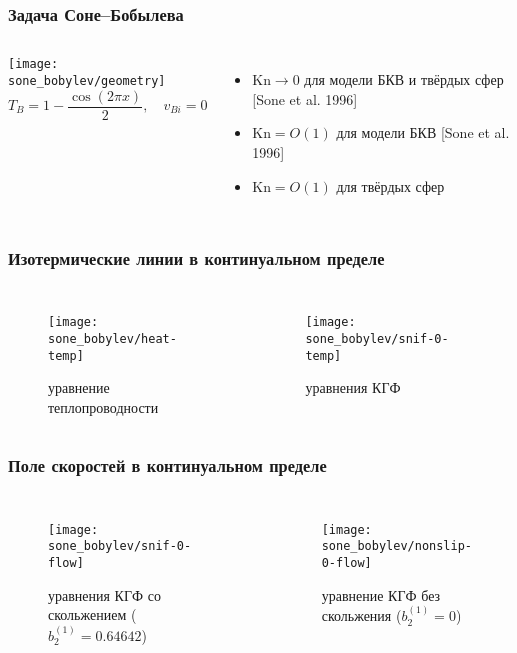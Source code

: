 \documentclass[mathserif]{beamer} %
\newcommand{\Kn}{\mathrm{Kn}}
\newcommand{\OO}[1]{O(#1)}
\begin{document}
\begin{frame}
    \frametitle{Задача Соне--Бобылева}
    \begin{columns}
        \hspace{-10pt}\texttt{[image: sone\_bobylev/geometry]}
        \[ T_B = 1 - \frac{\cos(2\pi x)}{2}, \quad v_{Bi} = 0 \]
        \begin{itemize}
            \item \(\Kn\to0\) для модели БКВ и твёрдых сфер [Sone et al. 1996]
            \smallskip
            \item \(\Kn=\OO{1}\) для модели БКВ [Sone et al. 1996]
            \smallskip
            \item \(\Kn=\OO{1}\) для твёрдых сфер
        \end{itemize}
    \end{columns}
\end{frame}

\begin{frame}
    \frametitle{Изотермические линии в континуальном пределе}
    \begin{columns}
        \begin{figure}
            \texttt{[image: sone\_bobylev/heat-temp]}
            \caption{уравнение теплопроводности}
        \end{figure}
        \begin{figure}
            \texttt{[image: sone\_bobylev/snif-0-temp]}
            \caption{уравнения КГФ}
        \end{figure}
    \end{columns}
\end{frame}

\begin{frame}
    \frametitle{Поле скоростей в континуальном пределе}
    \begin{columns}
        \begin{figure}
            \texttt{[image: sone\_bobylev/snif-0-flow]}
            \caption{уравнения КГФ со скольжением (\(b_2^{(1)} = 0.64642\))}
        \end{figure}
        \begin{figure}
            \texttt{[image: sone\_bobylev/nonslip-0-flow]}
            \caption{уравнение КГФ без скольжения (\(b_2^{(1)} = 0\))}
        \end{figure}
    \end{columns}
\end{frame}
\end{document}
